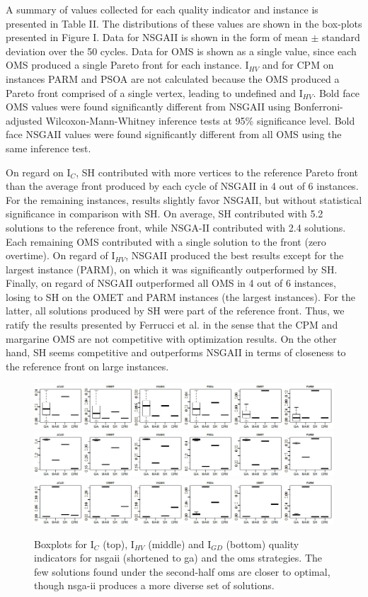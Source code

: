\documentclass[conference]{IEEEtran}
\begin{document}
A summary of values collected for each quality indicator and instance is presented in Table II. The distributions of these values are shown in the box-plots presented in Figure I. Data for NSGAII is shown in the form of mean $\pm$ standard deviation over the 50 cycles. Data for OMS is shown as a single value, since each OMS produced a single Pareto front for each instance. I$_{HV}$ and  for CPM on instances PARM and PSOA are not calculated because the OMS produced a Pareto front comprised of a single vertex, leading to undefined  and I$_{HV}$. Bold face OMS values were found significantly different from NSGAII using Bonferroni-adjusted Wilcoxon-Mann-Whitney inference tests at 95\% significance level. Bold face NSGAII values were found significantly different from all OMS using the same inference test. 

On regard on I$_{C}$, SH contributed with more vertices to the reference Pareto front than the average front produced by each cycle of NSGAII in 4 out of 6 instances. For the remaining instances, results slightly favor NSGAII, but without statistical significance in comparison with SH. On average, SH contributed with 5.2 solutions to the reference front, while NSGA-II contributed with 2.4 solutions. Each remaining OMS contributed with a single solution to the front (zero overtime). On regard of I$_{HV}$, NSGAII produced the best results except for the largest instance (PARM), on which it was significantly outperformed by SH. Finally, on regard of  NSGAII outperformed all OMS in 4 out of 6 instances, losing to SH on the OMET and PARM instances (the largest instances). For the latter, all solutions produced by SH were part of the reference front. Thus, we ratify the results presented by Ferrucci et al. \cite{Ferrucci:2013} in the sense that the CPM and margarine OMS are not competitive with optimization results. On the other hand, SH seems competitive and outperforms NSGAII in terms of closeness to the reference front on large instances.


\begin{figure}
\centering
\includegraphics[width=18cm]{RQ2_boxplot_ic.jpg}
\includegraphics[width=18cm]{RQ2_boxplot_IHV.jpg}
\includegraphics[width=18cm]{RQ2_boxplot_igd.jpg}
\caption{Boxplots for I$_{C}$ (top), I$_{HV}$ (middle) and I$_{GD}$ (bottom) quality indicators for nsgaii (shortened to ga) and the oms strategies. The few solutions found under the second-half oms are closer to optimal, though nsga-ii produces a more diverse set of solutions.}
\end{figure}
\end{document}
